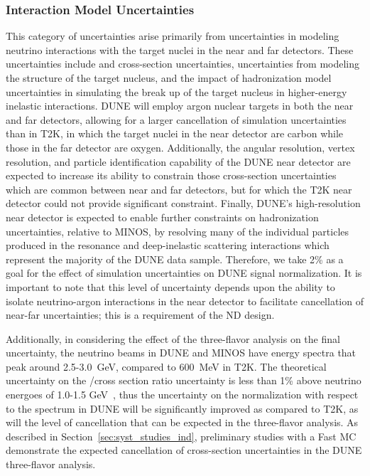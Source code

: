 \subsubsection{Interaction Model Uncertainties}
\label{sec:syst_just_sim}
This category of uncertainties arise primarily from uncertainties in modeling neutrino interactions with the target
nuclei in the near and far detectors. These uncertainties include \nue and \numu cross-section uncertainties,
uncertainties from modeling the structure of the target nucleus, and the impact of
hadronization model uncertainties in simulating the break up of the target nucleus in higher-energy inelastic
interactions. DUNE will employ argon nuclear targets in both the near and far detectors, allowing for a larger
cancellation of simulation uncertainties than in T2K, in which the target nuclei in the near detector are
carbon while those in the far detector are oxygen. Additionally, the angular resolution, vertex resolution,
and particle identification capability of the DUNE near detector are expected to increase its ability to
constrain those cross-section uncertainties which are common between near and far detectors, but for which
the T2K near detector could not provide significant constraint.
Finally, DUNE's high-resolution near
detector is expected to enable further constraints on hadronization uncertainties, relative to MINOS, by
resolving many of the individual particles produced in the resonance and deep-inelastic scattering interactions
which represent the majority of the DUNE data sample. Therefore, we take 2\% as a goal for the effect of
simulation uncertainties on DUNE \nue signal normalization. It is important to note that this level of
uncertainty depends upon the ability to isolate neutrino-argon interactions in the near detector to facilitate
cancellation of near-far uncertainties; this is a requirement of the ND design.

Additionally, in considering the effect of the three-flavor analysis on the final uncertainty,
the neutrino beams in DUNE and MINOS have energy
spectra that peak around 2.5-3.0~GeV, compared to 600~MeV in T2K. 
The theoretical uncertainty on the \nue/\numu cross section ratio uncertainty is
less than 1\% above neutrino energoes of 1.0-1.5 GeV~\cite{Day-McFarland:2012},
thus the uncertainty on the \nue normalization with respect to the \numu spectrum in DUNE will be significantly improved as compared to T2K,
as will the level of cancellation that can be expected in the three-flavor analysis. As
described in Section~\ref{sec:syst_studies_ind}, preliminary studies with a Fast MC demonstrate the
expected cancellation of cross-section uncertainties in the DUNE three-flavor analysis.

